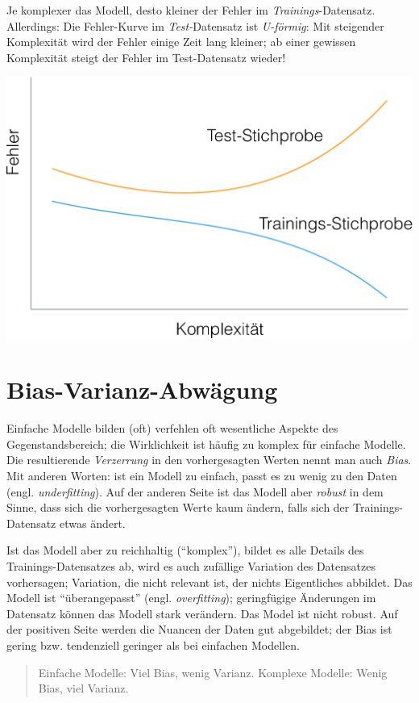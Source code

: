 \documentclass[12pt,ngerman,]{book}
\begin{document}
Je komplexer das Modell, desto kleiner der Fehler im
\emph{Trainings}-Datensatz. Allerdings: Die Fehler-Kurve im
\emph{Test-}Datensatz ist \emph{U-förmig}: Mit steigender Komplexität
wird der Fehler einige Zeit lang kleiner; ab einer gewissen Komplexität
steigt der Fehler im Test-Datensatz wieder!

\begin{center}\includegraphics[width=0.7\linewidth]{images/overfitting} \end{center}

\section{Bias-Varianz-Abwägung}\label{bias-varianz-abwagung}

Einfache Modelle bilden (oft) verfehlen oft wesentliche Aspekte des
Gegenstandsbereich; die Wirklichkeit ist häufig zu komplex für einfache
Modelle. Die resultierende \emph{Verzerrung} in den vorhergesagten
Werten nennt man auch \emph{Bias}. Mit anderen Worten: ist
ein Modell zu einfach, passt es zu wenig zu den Daten (engl.
\emph{underfitting}). Auf der anderen Seite ist das Modell aber
\emph{robust} in dem Sinne, dass sich die vorhergesagten
Werte kaum ändern, falls sich der Trainings-Datensatz etwas ändert.

Ist das Modell aber zu reichhaltig (``komplex''), bildet es alle Details
des Trainings-Datensatzes ab, wird es auch zufällige Variation des
Datensatzes vorhersagen; Variation, die nicht relevant ist, der nichts
Eigentliches abbildet. Das Modell ist ``überangepasst'' (engl.
\emph{overfitting}); geringfügige Änderungen im Datensatz können das
Modell stark verändern. Das Model ist nicht robust. Auf der positiven
Seite werden die Nuancen der Daten gut abgebildet; der Bias ist gering
bzw. tendenziell geringer als bei einfachen Modellen.

\begin{quote}
Einfache Modelle: Viel Bias, wenig Varianz. Komplexe Modelle: Wenig
Bias, viel Varianz.
\end{quote}
\end{document}
